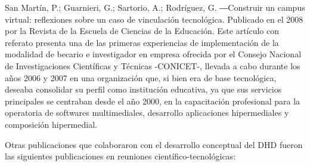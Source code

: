 San Martín, P.; Guarnieri, G.; Sartorio, A.; Rodríguez, G. ―Construir un campus
virtual: reflexiones sobre un caso de vinculación tecnológica. Publicado en el
2008 por la Revista de la Escuela de Ciencias de la Educación. Este artículo con referato
presenta una de las primeras experiencias de implementación de la modalidad de
becario e investigador en empresa ofrecida por el Consejo Nacional de
Investigaciones Científicas y Técnicas -CONICET-, llevada a cabo durante los
años 2006 y 2007 en una organización que, si bien era de base tecnológica,
deseaba consolidar su perfil como institución educativa, ya que sus servicios
principales se centraban desde el año 2000, en la capacitación profesional para
la operatoria de softwares multimediales, desarrollo aplicaciones hipermediales
y composición hipermedial.


Otras publicaciones que colaboraron con el desarrollo conceptual del DHD fueron las siguientes publicaciones en reuniones científico-tecnológicas: 

